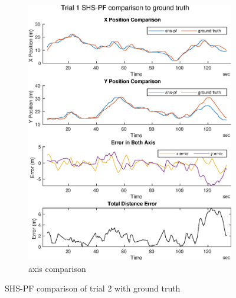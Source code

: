 \begin{figure}[H]
\begin{subfigure}[t]{.45\textwidth}
		\includegraphics[width=\linewidth]{images/20201029_1603_shs-pf_trial_1_1}
		\caption{axis comparison}
		\label{fig:shspf_trial2_comparison}
	\end{subfigure}
	\caption{SHS-PF comparison of trial 2 with ground truth}
	\label{fig:shspf_trial2_shs_gt_comparison}
\end{figure}

